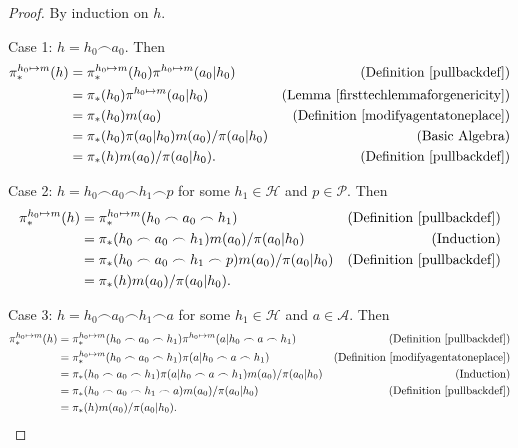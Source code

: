 \documentclass[runningheads]{llncs}
\begin{document}
\begin{proof}
    By induction on $h$.

    Case 1: $h=h_0\frown a_0$. Then
    \begin{align*}
        \pi^{h_0\mapsto m}_*(h)
        &= \pi^{h_0\mapsto m}_*(h_0)\pi^{h_0\mapsto m}(a_0|h_0)
            &\mbox{(Definition \ref{pullbackdef})}\\
        &= \pi_*(h_0)\pi^{h_0\mapsto m}(a_0|h_0)
            &\mbox{(Lemma \ref{firsttechlemmaforgenericity})}\\
        &= \pi_*(h_0)m(a_0)
            &\mbox{(Definition \ref{modifyagentatoneplace})}\\
        &= \pi_*(h_0)\pi(a_0|h_0)m(a_0)/\pi(a_0|h_0)
            &\mbox{(Basic Algebra)}\\
        &= \pi_*(h)m(a_0)/\pi(a_0|h_0).
            &\mbox{(Definition \ref{pullbackdef})}
    \end{align*}

    Case 2: $h=h_0\frown a_0\frown h_1\frown p$ for some $h_1\in\mathcal H$
        and $p\in\mathcal P$. Then
    \begin{align*}
        \pi^{h_0\mapsto m}_*(h)
        &= \pi^{h_0\mapsto m}_*(h_0\frown a_0\frown h_1)
            &\mbox{(Definition \ref{pullbackdef})}\\
        &= \pi_*(h_0\frown a_0\frown h_1)m(a_0)/\pi(a_0|h_0)
            &\mbox{(Induction)}\\
        &= \pi_*(h_0\frown a_0\frown h_1\frown p)m(a_0)/\pi(a_0|h_0)
            &\mbox{(Definition \ref{pullbackdef})}\\
        &= \pi_*(h)m(a_0)/\pi(a_0|h_0).
    \end{align*}

    Case 3: $h=h_0\frown a_0\frown h_1\frown a$ for some $h_1\in\mathcal H$ and
        $a\in\mathcal A$. Then
    \begin{align*}
        \pi^{h_0\mapsto m}_*(h)
        &= \pi^{h_0\mapsto m}_*(h_0\frown a_0\frown h_1)
            \pi^{h_0\mapsto m}(a|h_0\frown a\frown h_1)
            &\mbox{(Definition \ref{pullbackdef})}\\
        &= \pi^{h_0\mapsto m}_*(h_0\frown a_0\frown h_1)
            \pi(a|h_0\frown a\frown h_1)
            &\mbox{(Definition \ref{modifyagentatoneplace})}\\
        &= \pi_*(h_0\frown a_0\frown h_1)\pi(a|h_0\frown a\frown h_1)m(a_0)/\pi(a_0|h_0)
            &\mbox{(Induction)}\\
        &= \pi_*(h_0\frown a_0\frown h_1\frown a)m(a_0)/\pi(a_0|h_0)
            &\mbox{(Definition \ref{pullbackdef})}\\
        &= \pi_*(h)m(a_0)/\pi(a_0|h_0).
    \end{align*}
\end{proof}
\end{document}
